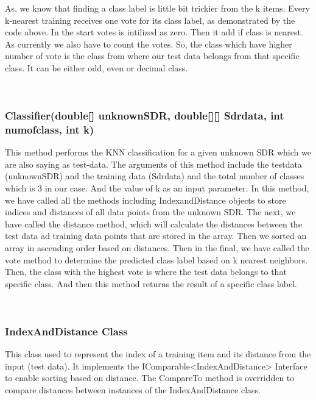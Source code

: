 \documentclass[conference]{IEEEtran}
\begin{document}
As, we know that finding a class label is little bit trickier from the k items. Every k-nearest training receives one vote for its class label, as demonstrated by the code above. In the start votes is intilized as zero. Then it add if class is nearest.  As currently we also have to count the votes. So, the class which have higher number of vote is the class from where our test data belongs from that specific class. It can be either odd, even or decimal class. 



\

\subsubsection{Classifier(double[] unknownSDR, double[][] Sdrdata, int numofclass, int k)}
This method performs the KNN classification for a given unknown SDR which we are also saying as test-data. The arguments of this method include the testdata (unknownSDR) and the training data (Sdrdata) and the total number of classes which is 3 in our case. And the value of k as an input parameter. In this method, we have called all the methods including IndexandDistance objects to store indices and distances of all data points from the unknown SDR. The next, we have called the distance method, which will calculate the distances between the test data ad training data points that are stored in the array. Then we sorted an array in ascending order based on distances. Then in the final, we have called the vote method to determine the predicted class label based on k nearest neighbors. Then, the class with the highest vote is where the test data belongs to that specific class. And then this method returns the result of a specific class label. 

\
\subsubsection{IndexAndDistance Class}
This class used to represent the index of a training item and its distance from the input (test data). It implements the IComparable<IndexAndDistance> Interface to enable sorting based on distance. The CompareTo method is overridden to compare distances between instances of the IndexAndDistance class.
\end{document}
